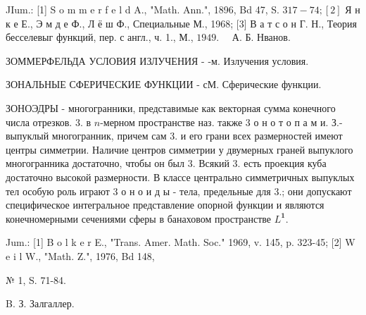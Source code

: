 \documentclass[10pt]{article}
\begin{document}
JIum.: [1] S o m m e r f e l d A., "Math. Ann.", 1896, Bd 47, S. $317-74 ;[2]$ Я н к е Е., Э м д е Ф., Л ё ш Ф., Специальные М., 1968; [3] В а т с о н Г. Н., Теория бесселевыг функций, пер. с англ., ч. 1., М., $1949 . \quad$ А. Б. Нванов.



ЗОММЕРФЕЛЬДА УСЛОВИЯ ИЗЛУЧЕНИЯ - -м. Излучения условия.



ЗОНАЛЬНЫЕ СФЕРИЧЕСКИЕ ФУНКЦИИ - сМ. Сферические функции.



ЗОНОЭДРЫ - многогранники, представимые как векторная сумма конечного числа отрезков. 3. в $n$-мерном пространстве наз. также 3 о н о т о п а м и. З.- выпуклый многогранник, причем сам 3. и его грани всех размерностей имеют центры симметрии. Наличие центров симметрии у двумерных граней выпуклого многогранника достаточно, чтобы он был 3. Всякий 3. есть проекция куба достаточно высокой размерности. В классе центрально симметричных выпуклых тел особую роль играют 3 о н о и д ы - тела, предельные для 3.; они допускают специфическое интегральное представление опорной функции и являются конечномерными сечениями сферы в банаховом пространстве $L^{\mathbf{1}}$.



Jum.: [1] B o l k e r E., "Trans. Amer. Math. Soc." 1969, v. 145, p. 323-45; [2] W e i l W., "Math. Z.", 1976, Bd 148,

№ 1, S. 71-84.

B. З. Залгаллер.
\end{document}
